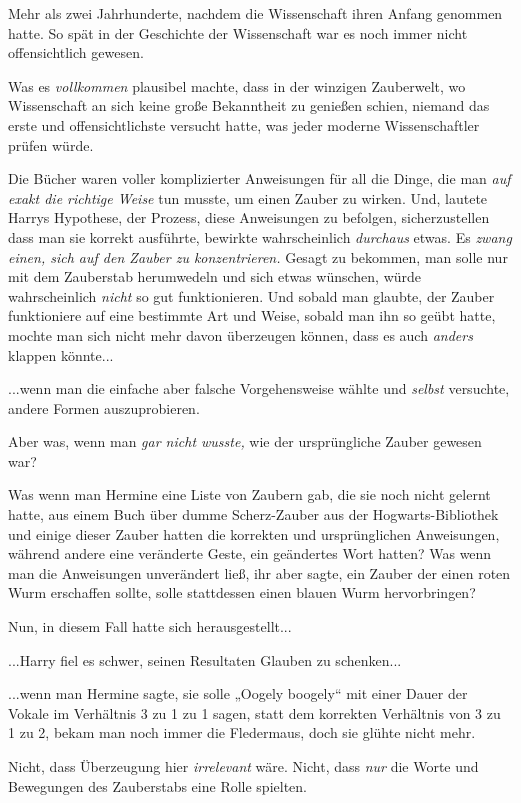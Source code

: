 {Mehr als zwei Jahrhunderte, nachdem die Wissenschaft ihren Anfang genommen hatte. So spät in der Geschichte der Wissenschaft war es noch immer nicht offensichtlich gewesen.

Was es \emph{vollkommen} plausibel machte, dass in der winzigen Zauberwelt, wo Wissenschaft an sich keine große Bekanntheit zu genießen schien, niemand das erste und offensichtlichste versucht hatte, was jeder moderne Wissenschaftler prüfen würde.

Die Bücher waren voller komplizierter Anweisungen für all die Dinge, die man \emph{auf exakt die richtige Weise} tun musste, um einen Zauber zu wirken. Und, lautete Harrys Hypothese, der Prozess, diese Anweisungen zu befolgen, sicherzustellen dass man sie korrekt ausführte, bewirkte wahrscheinlich \emph{durchaus} etwas. Es \emph{zwang einen, sich auf den Zauber zu konzentrieren.} Gesagt zu bekommen, man solle nur mit dem Zauberstab herumwedeln und sich etwas wünschen, würde wahrscheinlich \emph{nicht} so gut funktionieren. Und sobald man glaubte, der Zauber funktioniere auf eine bestimmte Art und Weise, sobald man ihn so geübt hatte, mochte man sich nicht mehr davon überzeugen können, dass es auch \emph{anders} klappen könnte...

...wenn man die einfache aber falsche Vorgehensweise wählte und \emph{selbst} versuchte, andere Formen auszuprobieren.

Aber was, wenn man \emph{gar nicht wusste,} wie der ursprüngliche Zauber gewesen war?

Was wenn man Hermine eine Liste von Zaubern gab, die sie noch nicht gelernt hatte, aus einem Buch über dumme Scherz-Zauber aus der Hogwarts-Bibliothek und einige dieser Zauber hatten die korrekten und ursprünglichen Anweisungen, während andere eine veränderte Geste, ein geändertes Wort hatten? Was wenn man die Anweisungen unverändert ließ, ihr aber sagte, ein Zauber der einen roten Wurm erschaffen sollte, solle stattdessen einen blauen Wurm hervorbringen?

Nun, in diesem Fall hatte sich herausgestellt...

...Harry fiel es schwer, seinen Resultaten Glauben zu schenken...

...wenn man Hermine sagte, sie solle „Oogely boogely“ mit einer Dauer der Vokale im Verhältnis 3 zu 1 zu 1 sagen, statt dem korrekten Verhältnis von 3 zu 1 zu 2, bekam man noch immer die Fledermaus, doch sie glühte nicht mehr.

Nicht, dass Überzeugung hier \emph{irrelevant} wäre. Nicht, dass \emph{nur} die Worte und Bewegungen des Zauberstabs eine Rolle spielten.

}
